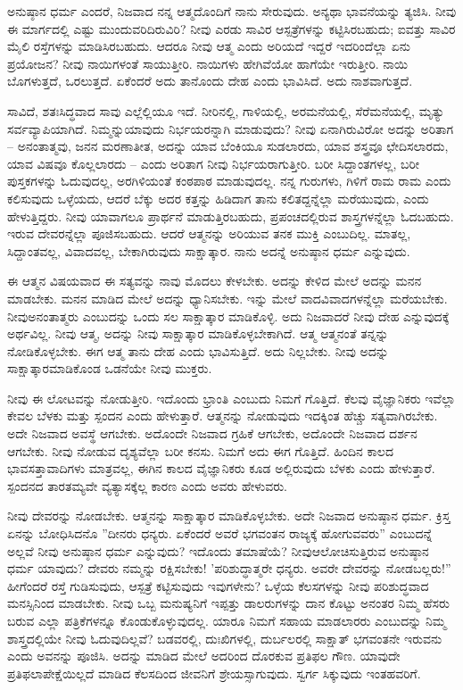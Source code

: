 ಅನುಷ್ಠಾನ ಧರ್ಮ ಎಂದರೆ, ನಿಜವಾದ ನನ್ನ ಆತ್ಮದೊಂದಿಗೆ ನಾನು ಸೇರುವುದು. ಅನ್ಯಥಾ ಭಾವನೆಯನ್ನು ತ್ಯಜಿಸಿ. ನೀವು ಈ ಮಾರ್ಗದಲ್ಲಿ ಎಷ್ಟು ಮುಂದುವರಿದಿರುವಿರಿ? ನೀವು ಎರಡು ಸಾವಿರ ಆಸ್ಪತ್ರೆಗಳನ್ನು ಕಟ್ಟಿಸಿರಬಹುದು; ಐವತ್ತು ಸಾವಿರ ಮೈಲಿ ರಸ್ತೆಗಳನ್ನು ಮಾಡಿಸಿರಬಹುದು. ಆದರೂ ನೀವು ಆತ್ಮ ಎಂದು ಅರಿಯದೆ ಇದ್ದರೆ ಇದರಿಂದೆಲ್ಲಾ ಏನು ಪ್ರಯೋಜನ? ನೀವು ನಾಯಿಗಳಂತೆ ಸಾಯುತ್ತೀರಿ. ನಾಯಿಗಳು ಹೇಗಿವೆಯೋ ಹಾಗೆಯೇ ಇರುತ್ತೀರಿ. ನಾಯಿ ಬೊಗಳುತ್ತದೆ, ಒರಲುತ್ತದೆ. ಏಕೆಂದರೆ ಅದು ತಾನೊಂದು ದೇಹ ಎಂದು ಭಾವಿಸಿದೆ. ಅದು ನಾಶವಾಗುತ್ತದೆ.

ಸಾವಿದೆ, ಶತಃಸಿದ್ಧವಾದ ಸಾವು ಎಲ್ಲೆಲ್ಲಿಯೂ ಇದೆ. ನೀರಿನಲ್ಲಿ, ಗಾಳಿಯಲ್ಲಿ, ಅರಮನೆಯಲ್ಲಿ, ಸೆರೆಮನೆಯಲ್ಲಿ, ಮೃತ್ಯು ಸರ್ವವ್ಯಾಪಿಯಾಗಿದೆ. ನಿಮ್ಮನ್ನು\break ಯಾವುದು ನಿರ್ಭಯರನ್ನಾಗಿ ಮಾಡುವುದು? ನೀವು ಏನಾಗಿರುವಿರೋ ಅದನ್ನು ಅರಿತಾಗ – ಅನಂತಾತ್ಮವು, ಜನನ ಮರಣಾತೀತ, ಅದನ್ನು ಯಾವ ಬೆಂಕಿಯೂ ಸುಡಲಾರದು, ಯಾವ ಶಸ್ತ್ರವೂ ಛೇದಿಸಲಾರದು, ಯಾವ ವಿಷವೂ ಕೊಲ್ಲಲಾರದು – ಎಂದು ಅರಿತಾಗ ನೀವು ನಿರ್ಭಯರಾಗುತ್ತೀರಿ. ಬರೀ ಸಿದ್ದಾಂತಗಳಲ್ಲ, ಬರೀ ಪುಸ್ತಕಗಳನ್ನು ಓದುವುದಲ್ಲ, ಅರಗಿಳಿಯಂತೆ ಕಂಠಪಾಠ ಮಾಡುವುದಲ್ಲ. ನನ್ನ ಗುರುಗಳು, ಗಿಳಿಗೆ ರಾಮ ರಾಮ ಎಂದು ಕಲಿಸುವುದು ಒಳ್ಳೆಯದು, ಆದರೆ ಬೆಕ್ಕು ಅದರ ಕತ್ತನ್ನು ಹಿಡಿದಾಗ ತಾನು ಕಲಿತದ್ದನ್ನೆಲ್ಲಾ ಮರೆಯುವುದು, ಎಂದು ಹೇಳುತ್ತಿದ್ದರು. ನೀವು ಯಾವಾಗಲೂ ಪ್ರಾರ್ಥನೆ ಮಾಡುತ್ತಿರಬಹುದು, ಪ್ರಪಂಚದಲ್ಲಿರುವ ಶಾಸ್ತ್ರಗಳನ್ನೆಲ್ಲಾ ಓದಬಹುದು. ಇರುವ ದೇವರನ್ನೆಲ್ಲಾ ಪೂಜಿಸಬಹುದು. ಆದರೆ ಆತ್ಮನನ್ನು ಅರಿಯುವ ತನಕ ಮುಕ್ತಿ ಎಂಬುದಿಲ್ಲ. ಮಾತಲ್ಲ, ಸಿದ್ದಾಂತವಲ್ಲ, ವಿವಾದವಲ್ಲ, ಬೇಕಾಗಿರುವುದು ಸಾಕ್ಷಾತ್ಕಾರ. ನಾನು ಅದನ್ನೆ ಅನುಷ್ಠಾನ ಧರ್ಮ ಎನ್ನುವುದು.

ಈ ಆತ್ಮನ ವಿಷಯವಾದ ಈ ಸತ್ಯವನ್ನು ನಾವು ಮೊದಲು ಕೇಳಬೇಕು. ಅದನ್ನು ಕೇಳಿದ ಮೇಲೆ ಅದನ್ನು ಮನನ ಮಾಡಬೇಕು. ಮನನ ಮಾಡಿದ ಮೇಲೆ ಅದನ್ನು ಧ್ಯಾನಿಸಬೇಕು. ಇನ್ನು ಮೇಲೆ ವಾದವಿವಾದಗಳನ್ನೆಲ್ಲಾ ಮರೆಯಬೇಕು. ನೀವು\break ಅನಂತಾತ್ಮರು ಎಂಬುದನ್ನು ಒಂದು ಸಲ ಸಾಕ್ಷಾತ್ಕಾರ ಮಾಡಿಕೊಳ್ಳಿ. ಅದು ನಿಜವಾದರೆ ನೀವು ದೇಹ ಎನ್ನುವುದಕ್ಕೆ ಅರ್ಥವಿಲ್ಲ. ನೀವು ಆತ್ಮ, ಅದನ್ನು ನೀವು ಸಾಕ್ಷಾತ್ಕಾರ ಮಾಡಿಕೊಳ್ಳಬೇಕಾಗಿದೆ. ಆತ್ಮ ಆತ್ಮನಂತೆ ತನ್ನನ್ನು ನೋಡಿಕೊಳ್ಳಬೇಕು. ಈಗ ಆತ್ಮ ತಾನು ದೇಹ ಎಂದು ಭಾವಿಸುತ್ತಿದೆ. ಅದು ನಿಲ್ಲಬೇಕು. ನೀವು ಅದನ್ನು ಸಾಕ್ಷಾತ್ಕಾರಮಾಡಿಕೊಂಡ ಒಡನೆಯೇ ನೀವು ಮುಕ್ತರು.

ನೀವು ಈ ಲೋಟವನ್ನು ನೋಡುತ್ತೀರಿ. ಇದೊಂದು ಭ್ರಾಂತಿ ಎಂಬುದು ನಿಮಗೆ ಗೊತ್ತಿದೆ. ಕೆಲವು ವೈಜ್ಞಾನಿಕರು ಇವೆಲ್ಲಾ ಕೇವಲ ಬೆಳಕು ಮತ್ತು ಸ್ಪಂದನ ಎಂದು ಹೇಳುತ್ತಾರೆ. ಆತ್ಮನನ್ನು ನೋಡುವುದು ಇದಕ್ಕಿಂತ ಹೆಚ್ಚು ಸತ್ಯವಾಗಿರಬೇಕು. ಅದೇ ನಿಜವಾದ ಅವಸ್ಥೆ ಆಗಬೇಕು. ಅದೊಂದೇ ನಿಜವಾದ ಗ್ರಹಿಕೆ ಆಗಬೇಕು, ಅದೊಂದೇ ನಿಜವಾದ ದರ್ಶನ ಆಗಬೇಕು. ನೀವು ನೋಡುವ ದೃಶ್ಯವೆಲ್ಲಾ ಬರೀ ಕನಸು. ನಿಮಗೆ ಅದು ಈಗ ಗೊತ್ತಿದೆ. ಹಿಂದಿನ ಕಾಲದ ಭಾವಸತ್ತಾವಾದಿಗಳು ಮಾತ್ರವಲ್ಲ, ಈಗಿನ ಕಾಲದ ವೈಜ್ಞಾನಿಕರು ಕೂಡ ಅಲ್ಲಿರುವುದು ಬೆಳಕು ಎಂದು ಹೇಳುತ್ತಾರೆ. ಸ್ಪಂದನದ ತಾರತಮ್ಯವೇ ವ್ಯತ್ಯಾಸಕ್ಕೆಲ್ಲ ಕಾರಣ ಎಂದು ಅವರು ಹೇಳುವರು.

ನೀವು ದೇವರನ್ನು ನೋಡಬೇಕು. ಆತ್ಮನನ್ನು ಸಾಕ್ಷಾತ್ಕಾರ ಮಾಡಿಕೊಳ್ಳಬೇಕು. ಅದೇ ನಿಜವಾದ ಅನುಷ್ಠಾನ ಧರ್ಮ. ಕ್ರಿಸ್ತ ಏನನ್ನು ಬೋಧಿಸಿದನೊ ''ದೀನರು ಧನ್ಯರು. ಏಕೆಂದರೆ ಅವರೆ ಭಗವಂತನ ರಾಜ್ಯಕ್ಕೆ ಹೋಗುವವರು'' ಎಂಬುದನ್ನೆ ಅಲ್ಲವೆ ನೀವು ಅನುಷ್ಠಾನ ಧರ್ಮ ಎನ್ನುವುದು? ಇದೊಂದು ತಮಾಷೆಯೆ? ನೀವು\break ಆಲೋಚಿಸುತ್ತಿರುವ ಅನುಷ್ಠಾನ ಧರ್ಮ ಯಾವುದು? ದೇವರು ನಮ್ಮನ್ನು ರಕ್ಷಿಸಬೇಕು! 'ಪರಿಶುದ್ಧಾತ್ಮರೇ ಧನ್ಯರು. ಅವರೇ ದೇವರನ್ನು ನೋಡಬಲ್ಲರು!” ಹೀಗೆಂದರೆ ರಸ್ತೆ ಗುಡಿಸುವುದು, ಆಸ್ಪತ್ರೆ ಕಟ್ಟಿಸುವುದು ಇವುಗಳೇನು? ಒಳ್ಳೆಯ ಕೆಲಸಗಳನ್ನು ನೀವು ಪರಿಶುದ್ಧವಾದ ಮನಸ್ಸಿನಿಂದ ಮಾಡಬೇಕು. ನೀವು ಒಬ್ಬ ಮನುಷ್ಯನಿಗೆ ಇಪ್ಪತ್ತು ಡಾಲರುಗಳನ್ನು ದಾನ ಕೊಟ್ಟು ಅನಂತರ ನಿಮ್ಮ ಹೆಸರು ಬರುವ ಎಲ್ಲಾ ಪತ್ರಿಕೆಗಳನ್ನೂ ಕೊಂಡುಕೊಳ್ಳುವುದಲ್ಲ. ಯಾರೂ ನಿಮಗೆ ಸಹಾಯ ಮಾಡಲಾರರು ಎಂಬುದನ್ನು ನಿಮ್ಮ ಶಾಸ್ತ್ರದಲ್ಲಿಯೇ ನೀವು ಓದುವುದಿಲ್ಲವೆ? ಬಡವರಲ್ಲಿ, ದುಃಖಿಗಳಲ್ಲಿ, ದುರ್ಬಲರಲ್ಲಿ ಸಾಕ್ಷಾತ್ ಭಗವಂತನೇ ಇರುವನು ಎಂದು ಅವನನ್ನು ಪೂಜಿಸಿ. ಅದನ್ನು ಮಾಡಿದ ಮೇಲೆ ಅದರಿಂದ ದೊರಕುವ ಪ್ರತಿಫಲ ಗೌಣ. ಯಾವುದೇ ಪ್ರತಿಫಲಾಪೇಕ್ಷೆಯಿಲ್ಲದೆ ಮಾಡಿದ ಕೆಲಸದಿಂದ ಜೀವನಿಗೆ ಶ್ರೇಯಸ್ಸಾಗುವುದು. ಸ್ವರ್ಗ ಸಿಕ್ಕುವುದು ಇಂತಹವರಿಗೆ.

